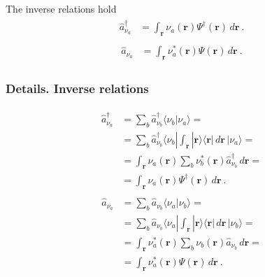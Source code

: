 \documentclass[letterpaper,10pt,english]{jupyterBook}
\begin{document}
\sphinxAtStartPar
The inverse relations hold
\begin{equation}\label{equation:ch/quantum-mechanics/many-body/quantum-fields:eq:qft:fields:creation:inverse}
\begin{split}\begin{aligned}
  \hat{a}^\dagger_{\nu_a} 
  & = \int_{\mathbf{r}} \nu_a(\mathbf{r}) \Psi^\dagger(\mathbf{r}) \, d \mathbf{r} \ .
\end{aligned}\end{split}
\end{equation}\begin{equation}\label{equation:ch/quantum-mechanics/many-body/quantum-fields:eq:qft:fields:annihilation:inverse}
\begin{split}\begin{aligned}
  \hat{a}_{\nu_a} 
  & = \int_{\mathbf{r}} \nu_a^*(\mathbf{r}) \Psi(\mathbf{r}) \, d \mathbf{r} \ .
\end{aligned}\end{split}
\end{equation}\subsubsection*{Details. Inverse relations}
\begin{equation*}
\begin{split}\begin{aligned}
  \hat{a}^\dagger_{\nu_a} 
  & = \sum_b \hat{a}_{\nu_b}^\dagger \langle \nu_b | \nu_a \rangle =  \\
  & = \sum_b \hat{a}_{\nu_b}^\dagger \langle \nu_b | \int_{\mathbf{r}} | \mathbf{r} \rangle \langle \mathbf{r} | \, d \mathbf{r} \, | \nu_a \rangle =  \\
  & = \int_{\mathbf{r}} \nu_a(\mathbf{r}) \sum_b \nu^*_b(\mathbf{r}) \hat{a}_{\nu_b}^\dagger \, d \mathbf{r} = \\
  & = \int_{\mathbf{r}} \nu_a(\mathbf{r}) \Psi^\dagger(\mathbf{r}) \, d \mathbf{r} \ .
\end{aligned}\end{split}
\end{equation*}\begin{equation*}
\begin{split}\begin{aligned}
  \hat{a}_{\nu_a} 
  & = \sum_b \hat{a}_{\nu_b} \langle \nu_a | \nu_b \rangle =  \\
  & = \sum_b \hat{a}_{\nu_b} \langle \nu_a | \int_{\mathbf{r}} | \mathbf{r} \rangle \langle \mathbf{r} | \, d \mathbf{r} \, | \nu_b \rangle =  \\
  & = \int_{\mathbf{r}} \nu_a^*(\mathbf{r}) \sum_b \nu_b(\mathbf{r}) \hat{a}_{\nu_b} \, d \mathbf{r} = \\
  & = \int_{\mathbf{r}} \nu_a^*(\mathbf{r}) \Psi(\mathbf{r}) \, d \mathbf{r} \ .
\end{aligned}\end{split}
\end{equation*}
\sphinxAtStartPar
{} 
\end{document}
